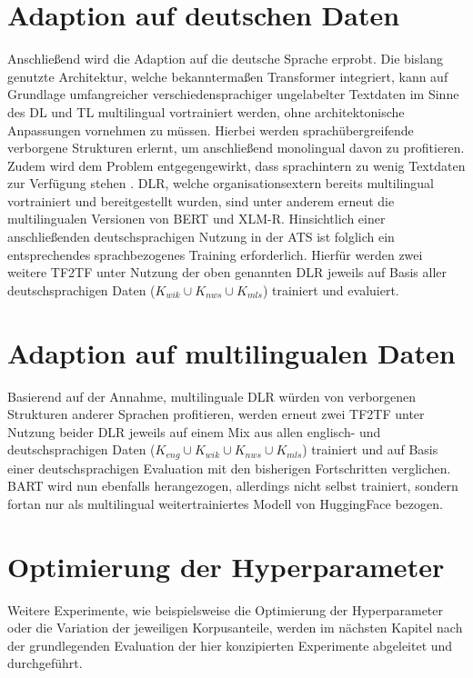 \section{Adaption auf deutschen Daten}
\noindent
Anschließend wird die Adaption auf die deutsche Sprache erprobt. Die bislang genutzte Architektur, welche bekanntermaßen Transformer integriert, kann auf Grundlage umfangreicher verschiedensprachiger ungelabelter Textdaten im Sinne des \ac{DL} und \ac{TL} multilingual vortrainiert werden, ohne architektonische Anpassungen vornehmen zu müssen. Hierbei werden sprachübergreifende verborgene Strukturen erlernt, um anschließend monolingual davon zu profitieren. Zudem wird dem Problem entgegengewirkt, dass sprachintern zu wenig Textdaten zur Verfügung stehen \cite{MOB20}. \ac{DLR}, welche organisationsextern bereits multilingual vortrainiert und bereitgestellt wurden, sind unter anderem erneut die multilingualen Versionen von \ac{BERT} und \ac{XLM-R}. Hinsichtlich einer anschließenden deutschsprachigen Nutzung in der \ac{ATS} ist folglich ein entsprechendes sprachbezogenes Training erforderlich. Hierfür werden zwei weitere \ac{TF2TF} unter Nutzung der oben genannten \ac{DLR} jeweils auf Basis aller deutschsprachigen Daten ($K_{wik} \cup K_{nws} \cup K_{mls}$) trainiert und evaluiert.


\section{Adaption auf multilingualen Daten}
\noindent
Basierend auf der Annahme, multilinguale \ac{DLR} würden von verborgenen Strukturen anderer Sprachen profitieren, werden erneut zwei \ac{TF2TF} unter Nutzung beider \ac{DLR} jeweils auf einem Mix aus allen englisch- und deutschsprachigen Daten ($K_{eng} \cup K_{wik} \cup K_{nws} \cup K_{mls}$) trainiert und auf Basis einer deutschsprachigen Evaluation mit den bisherigen Fortschritten verglichen. \ac{BART} wird nun ebenfalls herangezogen, allerdings nicht selbst trainiert, sondern fortan nur als multilingual weitertrainiertes Modell von HuggingFace bezogen.
\newpage


\section{Optimierung der Hyperparameter}
\noindent
Weitere Experimente, wie beispielsweise die Optimierung der Hyperparameter oder die Variation der jeweiligen Korpusanteile, werden im nächsten Kapitel nach der grundlegenden Evaluation der hier konzipierten Experimente abgeleitet und durchgeführt.

